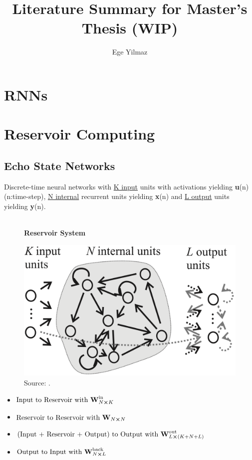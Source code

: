 \documentclass{article}
\title{Literature Summary for Master's Thesis (WIP)}
\author{ Ege Yilmaz}
\begin{document}
\maketitle
\tableofcontents

\clearpage

\section{RNNs}

\section{Reservoir Computing}

\subsection{Echo State Networks \cite{jäger}}
Discrete-time neural networks with
\underline{K input} units with activations yielding \textbf{u}(n) (n:time-step), \underline{N internal} recurrent units yielding \textbf{x}(n) and \underline{L output} units yielding \textbf{y}(n). \\\\

\begin{figure}[!htbp]
     \centering
     \textbf{Reservoir System}\par\medskip
     \includegraphics[scale=0.18]{reservoir.png}
     \caption{Source: \cite{jäger}.}
\end{figure}

\begin{itemize}
    \item $\text{Input to Reservoir with }\textbf{W}^{\text{in}}_{N\cross K}$
    \item $\text{Reservoir to Reservoir with }\textbf{W}_{N\cross N}$
    \item $\text{(Input + Reservoir + Output) to Output with }\textbf{W}^{\text{out}}_{L\cross (K+N+L)}$
    \item $\text{Output to Input with }\textbf{W}^{\text{back}}_{N\cross L}$
    
\end{itemize}
\end{document}
